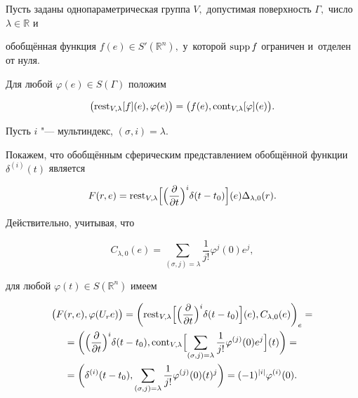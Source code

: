 \smallskip



\begin{definition}[7]Пусть заданы однопараметрическая группа $V,$ допустимая поверхность $\Gamma,$ число $\lambda \in \mathbb R$ и

обобщённая функция $f(e) \in S'(\mathbb R^n),$ у~которой ${\rm supp\,} f$ ограничен и~отделен от нуля. 

Для любой $\varphi(e) \in S(\Gamma)$ положим 

$$\bigl({\rm rest}_{V,\lambda}[f](e),\varphi(e)\bigr)=\bigl(f(e),{\rm cont}_{V,\lambda}[\varphi](e)\bigr).$$

\end{definition}



\smallskip



\begin{example} Пусть $i$ "--- мультиндекс, $(\sigma, i)=\lambda.$

Покажем, что обобщённым сферическим представлением обобщённой функции $\delta^{(i)}(t)$ является

$$F(r,e)= {\rm rest}_{V, \lambda}\Bigl[\Bigl(\frac{\partial}{\partial t}\Bigr)^{i}\delta(t-t_0)\Bigr](e)

\Delta_{\lambda,0}(r).$$

Действительно, учитывая, что 

$$C_{\lambda, 0}(e)=\sum_{(\sigma,j)=\lambda} \frac1{j!}\varphi^{j}(0)e^j,$$

для любой $\varphi(t) \in S(\mathbb R^n)$ имеем

\begin{multline*}

\bigl(F(r,e), \varphi(U_re) \bigr)=

\biggl( {\rm rest}_{V, \lambda}\Bigl[ \Bigl(\frac{\partial}{\partial t}\Bigr)^{i}\delta(t-t_0)\Bigr](e) ,C_{\lambda,0}(e)\biggr)_e=\\

=\biggl( \Bigl(\frac{\partial}{\partial t}\Bigr)^{i}\delta(t-t_0), {\rm cont}_{V, \lambda}\Bigl[

\sum_{(\sigma,j)= \lambda}\frac1{j!}\varphi^{(j)}(0)e^j\Bigr](t)\biggr)= \\

=\biggl(\delta^{(i)}(t-t_0),\sum_{(\sigma,j)=\lambda}\frac1{j!}\varphi^{(j)}(0)(t)^j\biggr)=(-1)^{|i|}\varphi^{(i)}(0).

\end{multline*}

\end{example}

